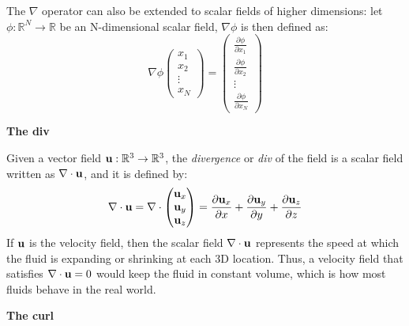 The $\nabla$ operator can also be extended to scalar fields of higher dimensions: let $\phi : \mathbb{R} ^N \rightarrow \mathbb{R} $ be an N-dimensional scalar field, $\nabla \phi$ is then defined as:
\begin{equation*}
    \nabla \phi \begin{pmatrix}
        x_1 \\
        x_2 \\
        \vdots \\
        x_N
    \end{pmatrix}
    =
    \left(
    \begin{aligned}
        \frac{\partial \phi}{\partial x_1} \\
        \frac{\partial \phi}{\partial x_2} \\
        \vdots~~ \\
        \frac{\partial \phi}{\partial x_N}
    \end{aligned} \right)
\end{equation*} 

\gapM

\textbf{The div}

\gapS

Given a vector field $\textbf{u} : \mathbb{R} ^3 \rightarrow \mathbb{R} ^3$, the \textit{divergence} or \textit{div} of the field is a scalar field written as $\nabla \cdot \textbf{u}$, and it is defined by:
$$
    \nabla \cdot \textbf{u} 
    = \nabla \cdot 
    \begin{pmatrix}
        \textbf{u}_x \\
        \textbf{u}_y \\
        \textbf{u}_z
    \end{pmatrix}
    =
    \frac{\partial \textbf{u}_x}{\partial x} +  
    \frac{\partial \textbf{u}_y}{\partial y} +
    \frac{\partial \textbf{u}_z}{\partial z}
$$
If $\textbf{u}$ is the velocity field, then the scalar field $\nabla \cdot \textbf{u}$ represents the speed at which the fluid is expanding or shrinking at each 3D location. Thus, a velocity field that satisfies $\nabla \cdot \textbf{u} = 0$ would keep the fluid in constant volume, which is how most fluids behave in the real world.


\gapM

\textbf{The curl}

\gapS

